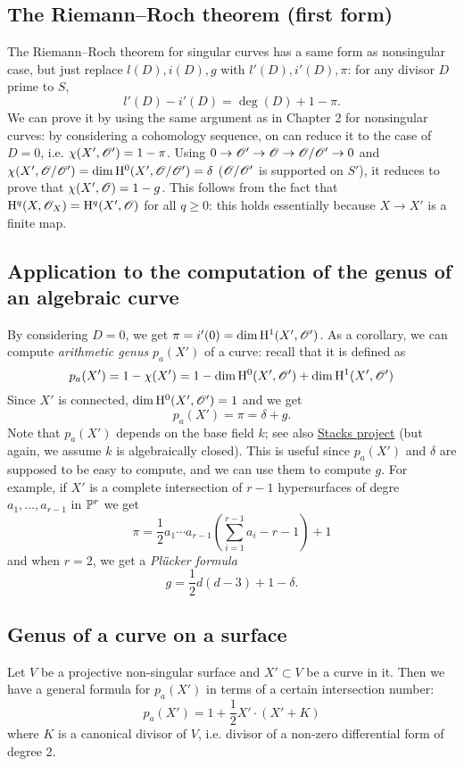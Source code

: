 \documentclass[letterpaper, 12pt]{article}
\begin{document}
\subsection{The Riemann--Roch theorem (first form)}

The Riemann--Roch theorem for singular curves has a same form as nonsingular case, but just replace $l(D), i(D), g$ with $l'(D), i'(D), \pi$: for any divisor $D$ prime to $S$,
$$
    l'(D) - i'(D) = \deg(D) + 1 - \pi.
$$
We can prove it by using the same argument as in Chapter 2 for nonsingular curves: by considering a cohomology sequence, on can reduce it to the case of $D = 0$, i.e. $\chi(X', \mathscr{O}') = 1 - \pi$.
Using $0 \to \mathscr{O}' \to \mathscr{O} \to \mathscr{O} / \mathscr{O}' \to 0$ and $\chi(X', \mathscr{O} / \mathscr{O}') = \dim \mathrm{H}^0(X', \mathscr{O} / \mathscr{O}') = \delta$ ($\mathscr{O} / \mathscr{O}'$ is supported on $S'$), it reduces to prove that $\chi(X', \mathscr{O}) = 1 - g$.
This follows from the fact that $\mathrm{H}^q(X, \mathscr{O}_X) = \mathrm{H}^q(X', \mathscr{O})$ for all $q \ge 0$: this holds essentially because $X \to X'$ is a finite map.


\subsection{Application to the computation of the genus of an algebraic curve}

By considering $D = 0$, we get $\pi = i'(0) = \dim \mathrm{H}^1(X', \mathscr{O}')$.
As a corollary, we can compute \emph{arithmetic genus} $p_a(X')$ of a curve: recall that it is defined as
$$
p_a(X') = 1 - \chi(X') = 1 - \dim \mathrm{H}^0(X', \mathscr{O}') + \dim \mathrm{H}^1(X', \mathscr{O}')
$$
Since $X'$ is connected, $\dim \mathrm{H}^0(X', \mathscr{O}') = 1$ and we get
$$
p_a(X') = \pi = \delta + g.
$$
Note that $p_a(X')$ depends on the base field $k$; see also \href{https://stacks.math.columbia.edu/tag/0BY6}{Stacks project} (but again, we assume $k$ is algebraically closed).
This is useful since $p_a(X')$ and $\delta$ are supposed to be easy to compute, and we can use them to compute $g$.
For example, if $X'$ is a complete intersection of $r-1$ hypersurfaces of degre $a_1, \dots, a_{r-1}$ in $\mathbb{P}^{r}$ we get
$$
\pi = \frac{1}{2} a_1 \cdots a_{r-1}\left(\sum_{i=1}^{r-1} a_i - r - 1 \right) + 1
$$
and when $r = 2$, we get a \emph{Pl\"ucker formula}
$$
g = \frac{1}{2} d (d - 3) + 1 - \delta.
$$

\subsection{Genus of a curve on a surface}

Let $V$ be a projective non-singular surface and $X' \subset V$ be a curve in it.
Then we have a general formula for $p_a(X')$ in terms of a certain intersection number:
$$
p_a(X') = 1 + \frac{1}{2}X'\cdot(X' + K)
$$
where $K$ is a canonical divisor of $V$, i.e. divisor of a non-zero differential form of degree 2.
\end{document}
